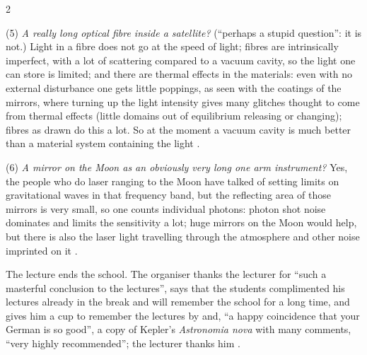 \begin{paracol}{2}
\begin{coursenote}
(5) \emph{A really long optical fibre inside a satellite?} (``perhaps a stupid question'': it is not.) Light in a fibre does not go at the speed of light; fibres are intrinsically imperfect, with a lot of scattering compared to a vacuum cavity, so the light one can store is limited; and there are thermal effects in the materials: even with no external disturbance one gets little poppings, as seen with the coatings of the mirrors, where turning up the light intensity gives many glitches thought to come from thermal effects (little domains out of equilibrium releasing or changing); fibres as drawn do this a lot. So at the moment a vacuum cavity is much better than a material system containing the light .

(6) \emph{A mirror on the Moon as an obviously very long one arm instrument?} Yes, the people who do laser ranging to the Moon have talked of setting limits on gravitational waves in that frequency band, but the reflecting area of those mirrors is very small, so one counts individual photons: photon shot noise dominates and limits the sensitivity a lot; huge mirrors on the Moon would help, but there is also the laser light travelling through the atmosphere and other noise imprinted on it .
\end{coursenote}

\begin{aside}
The lecture ends the school. The organiser thanks the lecturer for ``such a masterful conclusion to the lectures'', says that the students complimented his lectures already in the break and will remember the school for a long time, and gives him a cup to remember the lectures by and, ``a happy coincidence that your German is so good'', a copy of Kepler's \emph{Astronomia nova} with many comments, ``very highly recommended''; the lecturer thanks him .
\end{aside}


\end{paracol}

